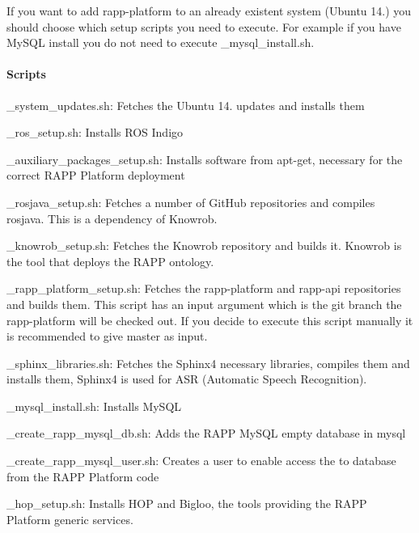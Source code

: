 If you want to add rapp-\/platform to an already existent system (Ubuntu 14.) you should choose which setup scripts you need to execute. For example if you have My\-S\-Q\-L install you do not need to execute {\-\_\-mysql\-\_\-install.\-sh}.

\paragraph*{Scripts}


\begin{DoxyItemize}
\item {\-\_\-system\-\_\-updates.\-sh}\-: Fetches the Ubuntu 14. updates and installs them
\item {\-\_\-ros\-\_\-setup.\-sh}\-: Installs R\-O\-S Indigo
\item {\-\_\-auxiliary\-\_\-packages\-\_\-setup.\-sh}\-: Installs software from apt-\/get, necessary for the correct R\-A\-P\-P Platform deployment
\item {\-\_\-rosjava\-\_\-setup.\-sh}\-: Fetches a number of Git\-Hub repositories and compiles rosjava. This is a dependency of Knowrob.
\item {\-\_\-knowrob\-\_\-setup.\-sh}\-: Fetches the Knowrob repository and builds it. Knowrob is the tool that deploys the R\-A\-P\-P ontology.
\item {\-\_\-rapp\-\_\-platform\-\_\-setup.\-sh}\-: Fetches the rapp-\/platform and rapp-\/api repositories and builds them. This script has an input argument which is the git branch the rapp-\/platform will be checked out. If you decide to execute this script manually it is recommended to give {\ttfamily master} as input.
\item {\-\_\-sphinx\-\_\-libraries.\-sh}\-: Fetches the Sphinx4 necessary libraries, compiles them and installs them, Sphinx4 is used for A\-S\-R (Automatic Speech Recognition).
\item {\-\_\-mysql\-\_\-install.\-sh}\-: Installs My\-S\-Q\-L
\item {\-\_\-create\-\_\-rapp\-\_\-mysql\-\_\-db.\-sh}\-: Adds the R\-A\-P\-P My\-S\-Q\-L empty database in mysql
\item {\-\_\-create\-\_\-rapp\-\_\-mysql\-\_\-user.\-sh}\-: Creates a user to enable access the to database from the R\-A\-P\-P Platform code
\item {\-\_\-hop\-\_\-setup.\-sh}\-: Installs H\-O\-P and Bigloo, the tools providing the R\-A\-P\-P Platform generic services.
\end{DoxyItemize}

